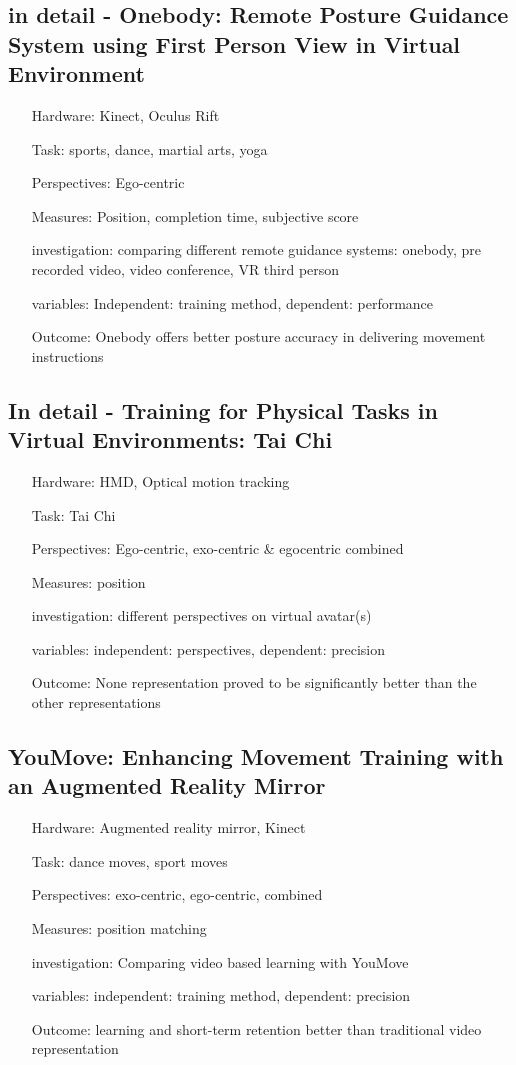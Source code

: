 \subsection{in detail - Onebody: Remote Posture Guidance System using First Person View in Virtual Environment}
\begin{itemize}
	\item[Hardware:] Kinect, Oculus Rift
	\item[Task:] sports, dance, martial arts, yoga
	\item[Perspectives:] Ego-centric
	\item[Measures:] Position, completion time, subjective score
	\item[investigation:] comparing different remote guidance systems: onebody, pre recorded video, video conference, VR third person
	\item[variables:] Independent: training method, dependent: performance
	\item[Outcome:] Onebody offers better posture accuracy in delivering movement instructions
\end{itemize}

\subsection{In detail - Training for Physical Tasks in Virtual Environments: Tai Chi}
\begin{itemize}
	\item[Hardware:] HMD, Optical motion tracking
	\item[Task:] Tai Chi
	\item[Perspectives:] Ego-centric, exo-centric \& egocentric combined
	\item[Measures:] position
	\item[investigation:] different perspectives on virtual avatar(s)
	\item[variables:] independent: perspectives, dependent: precision
	\item[Outcome:] None representation proved to be significantly better than the other representations
\end{itemize}

\subsection{YouMove: Enhancing Movement Training with an Augmented Reality Mirror}
\begin{itemize}
	\item[Hardware:] Augmented reality mirror, Kinect
	\item[Task:] dance moves, sport moves
	\item[Perspectives:] exo-centric, ego-centric, combined
	\item[Measures:] position matching
	\item[investigation:] Comparing video based learning with YouMove
	\item[variables:] independent: training method, dependent: precision
	\item[Outcome:] learning and short-term retention better than traditional video representation
\end{itemize}

